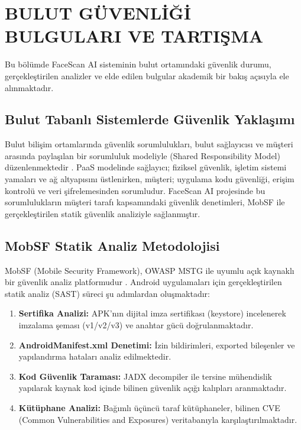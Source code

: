\section{BULUT GÜVENLİĞİ BULGULARI VE TARTIŞMA}

Bu bölümde FaceScan AI sisteminin bulut ortamındaki güvenlik durumu, gerçekleştirilen analizler ve elde edilen bulgular akademik bir bakış açısıyla ele alınmaktadır.

\subsection{Bulut Tabanlı Sistemlerde Güvenlik Yaklaşımı}

Bulut bilişim ortamlarında güvenlik sorumlulukları, bulut sağlayıcısı ve müşteri arasında paylaşılan bir sorumluluk modeliyle (Shared Responsibility Model) düzenlenmektedir \cite{mell2011nist}. PaaS modelinde sağlayıcı; fiziksel güvenlik, işletim sistemi yamaları ve ağ altyapısını üstlenirken, müşteri; uygulama kodu güvenliği, erişim kontrolü ve veri şifrelemesinden sorumludur. FaceScan AI projesinde bu sorumlulukların müşteri tarafı kapsamındaki güvenlik denetimleri, MobSF ile gerçekleştirilen statik güvenlik analiziyle sağlanmıştır.

\subsection{MobSF Statik Analiz Metodolojisi}

MobSF (Mobile Security Framework), OWASP MSTG ile uyumlu açık kaynaklı bir güvenlik analiz platformudur \cite{mobsf2023docs}. Android uygulamaları için gerçekleştirilen statik analiz (SAST) süreci şu adımlardan oluşmaktadır:

\begin{enumerate}
  \item \textbf{Sertifika Analizi:} APK'nın dijital imza sertifikası (keystore) incelenerek imzalama şeması (v1/v2/v3) ve anahtar gücü doğrulanmaktadır.
  \item \textbf{AndroidManifest.xml Denetimi:} İzin bildirimleri, exported bileşenler ve yapılandırma hataları analiz edilmektedir.
  \item \textbf{Kod Güvenlik Taraması:} JADX decompiler ile tersine mühendislik yapılarak kaynak kod içinde bilinen güvenlik açığı kalıpları aranmaktadır.
  \item \textbf{Kütüphane Analizi:} Bağımlı üçüncü taraf kütüphaneler, bilinen CVE (Common Vulnerabilities and Exposures) veritabanıyla karşılaştırılmaktadır.
\end{enumerate}

